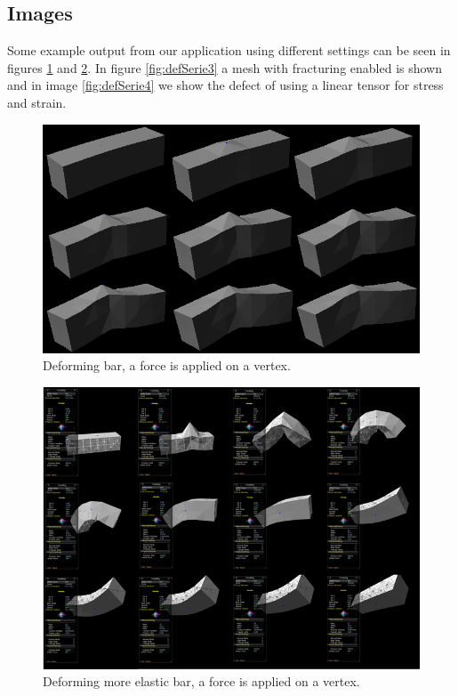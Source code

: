\documentclass[10pt,a4paper]{article}
\begin{document}
\subsection{Images}
Some example output from our application using different settings can be seen in figures \ref{fig:defSerie} and \ref{fig:defSerie2}. In figure \ref{fig:defSerie3} a mesh with fracturing enabled is shown and in image \ref{fig:defSerie4} we show the defect of using a linear tensor for stress and strain.

\begin{figure}[htpb]
\centering
\includegraphics[width=\columnwidth]{figures/defSerie.png}
\caption{Deforming bar, a force is applied on a vertex.}
\label{fig:defSerie}
\end{figure}

\begin{figure}[htpb]
\centering
\includegraphics[width=\columnwidth]{figures/defSerie2.png}
\caption{Deforming more elastic bar, a force is applied on a vertex.}
\label{fig:defSerie2}
\end{figure}
\end{document}
